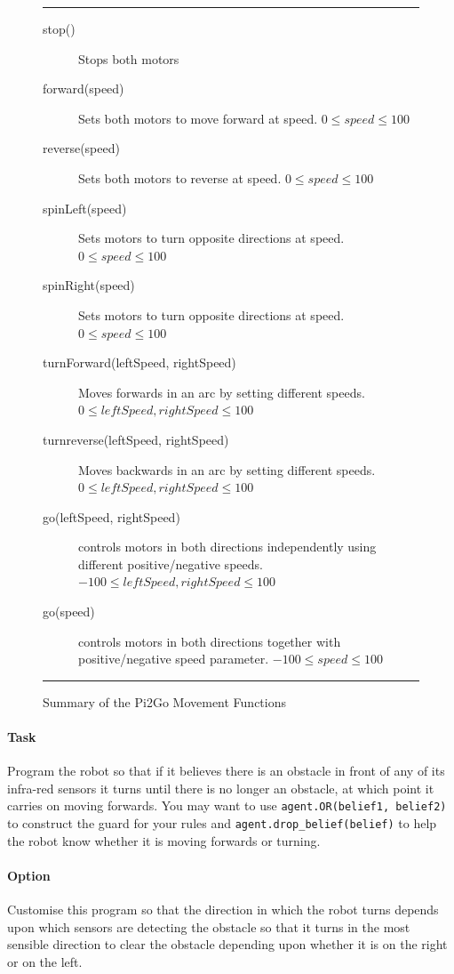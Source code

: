 \documentclass[a4,12pt]{article}
\begin{document}
\begin{figure}[htbp]
  \hrule
\begin{sloppypar}
\begin{description}
\item[stop()] Stops both motors
\item[forward(speed)] Sets both motors to move forward at speed. $0 \leq speed \leq 100$
\item[reverse(speed)] Sets both motors to reverse at speed. $0 \leq speed \leq 100$
\item[spinLeft(speed)] Sets motors to turn opposite directions at speed. $0 \leq speed \leq 100$
\item[spinRight(speed)] Sets motors to turn opposite directions at speed. $0 \leq speed \leq 100$
\item[turnForward(leftSpeed, rightSpeed)] Moves forwards in an arc by setting different speeds. $0 \leq leftSpeed, rightSpeed \leq 100$
\item[turnreverse(leftSpeed, rightSpeed)] Moves backwards in an arc by setting different speeds. $0 \leq leftSpeed, rightSpeed \leq 100$
\item[go(leftSpeed, rightSpeed)] controls motors in both directions independently using different positive/negative speeds. $-100\leq leftSpeed, rightSpeed \leq 100$
\item[go(speed)] controls motors in both directions together with positive/negative speed parameter. $-100\leq speed \leq 100$
\end{description}
\end{sloppypar}
\hrule
\caption{Summary of the Pi2Go Movement Functions}
\label{fig:move_functions}
\end{figure}

\paragraph{Task} Program the robot so that if it believes there is an obstacle in front of any of its infra-red sensors it turns until there is no longer an obstacle, at which point it carries on moving forwards.  You may want to use \lstinline{agent.OR(belief1, belief2)} to construct the guard for your rules and \lstinline{agent.drop_belief(belief)} to help the robot know whether it is moving forwards or turning.

\paragraph{Option} Customise this program so that the direction in which the robot turns depends upon which sensors are detecting the obstacle so that it turns in the most sensible direction to clear the obstacle depending upon whether it is on the right or on the left.
\end{document}
